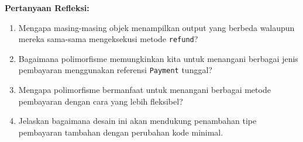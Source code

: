 \textbf{Pertanyaan Refleksi:}
\begin{enumerate}
	\item Mengapa masing-masing objek menampilkan output yang berbeda walaupun mereka sama-sama mengeksekusi metode \texttt{refund}?
	\begin{tcolorbox}[colback=white, colframe=black,  width=\linewidth, height=3cm,  boxrule=1pt, sharp corners]
	\end{tcolorbox}
	\item Bagaimana polimorfisme memungkinkan kita untuk menangani berbagai jenis pembayaran menggunakan referensi \texttt{Payment} tunggal?
	\begin{tcolorbox}[colback=white, colframe=black,  width=\linewidth, height=3cm,  boxrule=1pt, sharp corners]
	\end{tcolorbox}
	\item Mengapa polimorfisme bermanfaat untuk menangani berbagai metode pembayaran dengan cara yang lebih fleksibel?
	\begin{tcolorbox}[colback=white, colframe=black,  width=\linewidth, height=3cm,  boxrule=1pt, sharp corners]
	\end{tcolorbox}
	\item Jelaskan bagaimana desain ini akan mendukung penambahan tipe pembayaran tambahan dengan perubahan kode minimal.
	\begin{tcolorbox}[colback=white, colframe=black,  width=\linewidth, height=3cm,  boxrule=1pt, sharp corners]
	\end{tcolorbox}
\end{enumerate}



